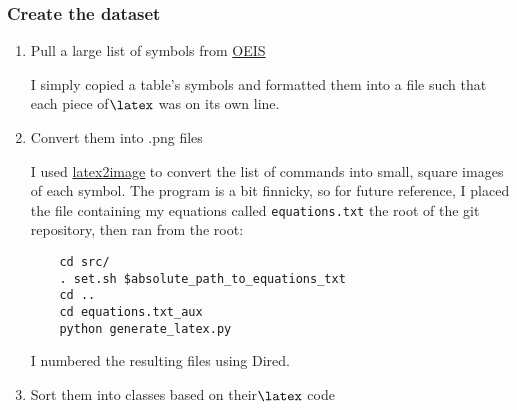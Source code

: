 \documentclass[11pt]{article}
\begin{document}
\subsubsection{Create the dataset}
\label{sec:org4e2212a}
\begin{enumerate}
\item Pull a large list of symbols from \href{https://oeis.org/wiki/List\_of\_LaTeX\_mathematical\_symbols}{OEIS}
\label{sec:orga267a0a}

I simply copied a table's symbols and formatted them into a file such that each piece of\(\latex\) was on its own line.
\item Convert them into .png files
\label{sec:org262aea8}

I used \href{https://github.com/mtyrolski/latex2image.git}{latex2image} to convert the list of commands into small, square images of each symbol. The program is a bit finnicky, so for future reference, I placed the file containing my equations called \texttt{equations.txt} the root of the git repository, then ran from the root:
\begin{verbatim}
    cd src/
    . set.sh $absolute_path_to_equations_txt
    cd ..
    cd equations.txt_aux
    python generate_latex.py
\end{verbatim}
I numbered the resulting files using Dired.
\item Sort them into classes based on their\(\latex\) code
\label{sec:org637709f}


\end{enumerate}
\end{document}
